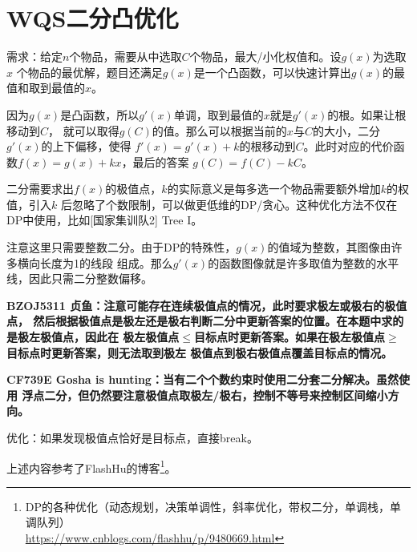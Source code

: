 \section{WQS二分凸优化}
需求：给定$n$个物品，需要从中选取$C$个物品，最大/小化权值和。设$g(x)$为选取$x$
个物品的最优解，题目还满足$g(x)$是一个凸函数，可以快速计算出$g(x)$的最值和取到最值的$x$。

因为$g(x)$是凸函数，所以$g'(x)$单调，取到最值的$x$就是$g'(x)$的根。如果让根移动到$C$，
就可以取得$g(C)$的值。那么可以根据当前的$x$与$C$的大小，二分$g'(x)$的上下偏移，使得
$f'(x)=g'(x)+k$的根移动到$C$。此时对应的代价函数$f(x)=g(x)+kx$，最后的答案
$g(C)=f(C)-kC$。

二分需要求出$f(x)$的极值点，$k$的实际意义是每多选一个物品需要额外增加$k$的权值，引入$k$
后忽略了个数限制，可以做更低维的DP/贪心。这种优化方法不仅在DP中使用，比如[国家集训队2]
Tree I。

注意这里只需要整数二分。由于DP的特殊性，$g(x)$的值域为整数，其图像由许多横向长度为1的线段
组成。那么$g'(x)$的函数图像就是许多取值为整数的水平线，因此只需二分整数偏移。

{\bfseries BZOJ5311 贞鱼：注意可能存在连续极值点的情况，此时要求极左或极右的极值点，
然后根据极值点是极左还是极右判断二分中更新答案的位置。在本题中求的是极左极值点，因此在
极左极值点$\leq$目标点时更新答案。如果在极左极值点$\geq$目标点时更新答案，则无法取到极左
极值点到极右极值点覆盖目标点的情况。}

{\bfseries CF739E Gosha is hunting：当有二个个数约束时使用二分套二分解决。虽然使用
浮点二分，但仍然要注意极值点取极左/极右，控制不等号来控制区间缩小方向。}

优化：如果发现极值点恰好是目标点，直接break。

上述内容参考了FlashHu的博客\footnote{
    DP的各种优化（动态规划，决策单调性，斜率优化，带权二分，单调栈，单调队列）\\
    \url{https://www.cnblogs.com/flashhu/p/9480669.html}
}。
